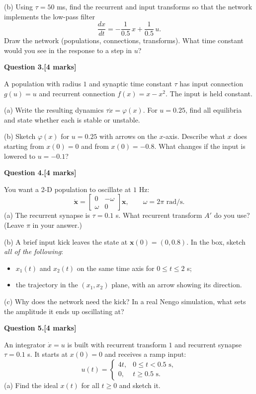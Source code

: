 \documentclass[11pt,letterpaper]{article}
\newcommand{\question}[2]{\par\vspace{10pt}\textbf{Question #1.}\hfill\textbf{[#2 marks]}\par}
\newcommand{\answerbox}[1]{\par\noindent\framebox[\linewidth]{\rule{0pt}{#1}}\par}
\begin{document}
(b) Using $\tau = 50$ ms, find the recurrent and input transforms so that the network implements the low-pass filter
\[
\frac{dx}{dt} = -\frac{1}{0.5}\,x + \frac{1}{0.5}\,u.
\]
Draw the network (populations, connections, transforms). What time constant would you see in the response to a step in $u$?
\vspace{5cm}

\newpage
\question{3}{4}
A population with radius $1$ and synaptic time constant $\tau$ has input connection $g(u) = u$ and recurrent connection $f(x) = x - x^2$. The input is held constant.

(a) Write the resulting dynamics $\tau\dot x = \varphi(x)$. For $u = 0.25$, find all equilibria and state whether each is stable or unstable.
\vspace{3.4cm}

(b) Sketch $\varphi(x)$ for $u = 0.25$ with arrows on the $x$-axis. Describe what $x$ does starting from $x(0) = 0$ and from $x(0) = -0.8$. What changes if the input is lowered to $u = -0.1$?
\answerbox{5.4cm}

\newpage
\question{4}{4}
You want a 2-D population to oscillate at $1$ Hz:
\[
\dot{\mathbf x} = \begin{bmatrix} 0 & -\omega \\ \omega & 0\end{bmatrix}\mathbf x, \qquad \omega = 2\pi \text{ rad/s}.
\]
(a) The recurrent synapse is $\tau = 0.1$ s. What recurrent transform $A'$ do you use? (Leave $\pi$ in your answer.)
\vspace{2.4cm}

(b) A brief input kick leaves the state at $\mathbf x(0) = (0, 0.8)$. In the box, sketch \emph{all of the following}:
\begin{itemize}
\item $x_1(t)$ and $x_2(t)$ on the same time axis for $0 \le t \le 2$ s;
\item the trajectory in the $(x_1, x_2)$ plane, with an arrow showing its direction.
\end{itemize}
\answerbox{5cm}

(c) Why does the network need the kick? In a real Nengo simulation, what sets the amplitude it ends up oscillating at?
\vspace{2.4cm}

\newpage
\question{5}{4}
An integrator $\dot x = u$ is built with recurrent transform $1$ and recurrent synapse $\tau = 0.1$ s. It starts at $x(0) = 0$ and receives a ramp input:
\[
u(t) = \begin{cases} 4t, & 0 \le t < 0.5 \text{ s},\\ 0, & t \ge 0.5 \text{ s}.\end{cases}
\]
(a) Find the ideal $x(t)$ for all $t \ge 0$ and sketch it.
\vspace{2.2cm}
\answerbox{3.6cm}
\end{document}
